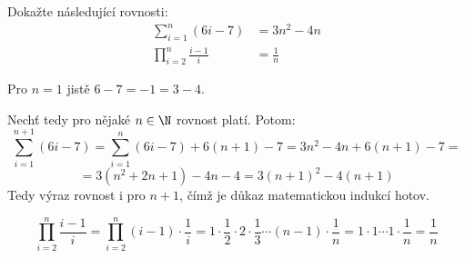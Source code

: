 \documentclass[12pt]{article}					%
\begin{document}
\newpage

\begin{priklad}
    Dokažte následující rovnosti: 
    \begin{align}
            \sum_{i=1}^n (6i-7) &= 3n^2 - 4n\\
            \prod_{i=2}^n \frac{i-1}{i} &= \frac{1}{n}
    \end{align}
    \begin{dukazin}
        Pro $n = 1$ jistě $6 - 7 = -1 = 3 - 4$.
        
        Nechť tedy pro nějaké $n \in \N$ rovnost platí. Potom:
        $$ \sum_{i=1}^{n+1}(6i - 7) = \sum_{i=1}^{n}(6i - 7) + 6(n+1) - 7 = 3n^2 - 4n + 6(n+1) - 7 = $$
        $$ = 3(n^2 + 2n + 1) - 4n - 4 = 3(n+1)^2 - 4(n+1) $$
        Tedy výraz rovnost i pro $n+1$, čímž je důkaz matematickou indukcí hotov.
    \end{dukazin}

    \begin{dukazin}[(2) přímý]
            $$ \prod_{i=2}^n \frac{i-1}{i} = \prod_{i=2}^n (i-1)\cdot\frac{1}{i} = 1\cdot \frac{1}{2}\cdot 2 \cdot\frac{1}{3} \cdots (n-1) \cdot \frac{1}{n} = 1\cdot 1 \cdots 1 \cdot \frac{1}{n} = \frac{1}{n} $$
    \end{dukazin}

\end{priklad}
\end{document}
